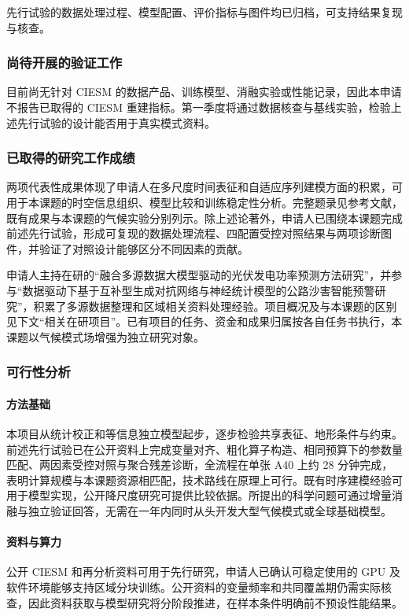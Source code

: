 先行试验的数据处理过程、模型配置、评价指标与图件均已归档，可支持结果复现与核查。

\subsubsection{尚待开展的验证工作}

目前尚无针对 CIESM 的数据产品、训练模型、消融实验或性能记录，因此本申请不报告已取得的 CIESM 重建指标。第一季度将通过数据核查与基线实验，检验上述先行试验的设计能否用于真实模式资料。

\subsubsection{已取得的研究工作成绩}

两项代表性成果体现了申请人在多尺度时间表征和自适应序列建模方面的积累，可用于本课题的时空信息组织、模型比较和训练稳定性分析。完整题录见参考文献，既有成果与本课题的气候实验分别列示。除上述论著外，申请人已围绕本课题完成前述先行试验，形成可复现的数据处理流程、四配置受控对照结果与两项诊断图件，并验证了对照设计能够区分不同因素的贡献。

申请人主持在研的“融合多源数据大模型驱动的光伏发电功率预测方法研究”，并参与“数据驱动下基于互补型生成对抗网络与神经统计模型的公路沙害智能预警研究”，积累了多源数据整理和区域相关资料处理经验。项目概况及与本课题的区别见下文“相关在研项目”。已有项目的任务、资金和成果归属按各自任务书执行，本课题以气候模式场增强为独立研究对象。

\subsubsection{可行性分析}

\paragraph{方法基础}
本项目从统计校正和等信息独立模型起步，逐步检验共享表征、地形条件与约束。前述先行试验已在公开资料上完成变量对齐、粗化算子构造、相同预算下的参数量匹配、两因素受控对照与聚合残差诊断，全流程在单张 A40 上约 28 分钟完成，表明计算规模与本课题资源相匹配，技术路线在原理上可行。既有时序建模经验可用于模型实现，公开降尺度研究可提供比较依据。所提出的科学问题可通过增量消融与独立验证回答，无需在一年内同时从头开发大型气候模式或全球基础模型。

\paragraph{资料与算力}
公开 CIESM 和再分析资料可用于先行研究，申请人已确认可稳定使用的 GPU 及软件环境能够支持区域分块训练。公开资料的变量频率和共同覆盖期仍需实际核查，因此资料获取与模型研究将分阶段推进，在样本条件明确前不预设性能结果。

